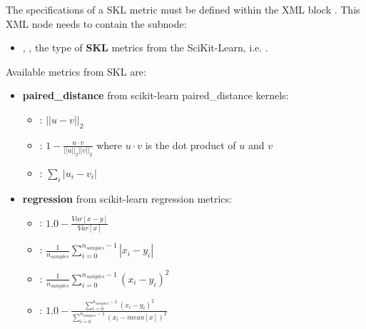 The specifications of a SKL metric must be defined within the XML block .
This XML node needs to contain the subnode:
\begin{itemize}
  \item {}, , the type of \textbf{SKL} metrics
    from the SciKit-Learn, i.e. .
\end{itemize}

Available metrics from SKL are:
\begin{itemize}
  \item   \textbf{paired\_distance} from scikit-learn paired\_distance kernels:
    \begin{itemize}
      \item {}: ${||u-v||}_2$
      \item {}: $1 - \frac{u \cdot v}{||u||_2 ||v||_2}$ where $u \cdot v$ is the dot product of $u$ and $v$
      \item {}: $\sum_i {\left| u_i - v_i \right|}$
    \end{itemize}

  \item \textbf{regression} from scikit-learn regression metrics:
    \begin{itemize}
      \item {}: $1.0 - \frac{Var[x-y]}{Var[x]}$
      \item {}: $\frac{1}{n_{samples}}\sum_{i=0}^{n_{samples}-1}|x_i-y_i|$
      \item {}: $\frac{1}{n_{samples}}\sum_{i=0}^{n_{samples}-1}(x_i-y_i)^2$
      \item {}: $1.0-\frac{\sum_{i=0}^{n_{samples}-1}(x_i-y_i)^2}{\sum_{i=0}^{n_{samples}-1}(x_i-mean[x])^2}$
    \end{itemize}
     
\end{itemize}

